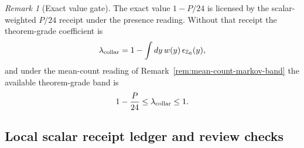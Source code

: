 \documentclass[11pt]{article}
\theoremstyle{remark}
\newtheorem{remark}[theorem]{Remark}
\theoremstyle{plain}
\begin{document}
\begin{remark}[Exact value gate]
\label{rem:exact-value-gate}
The exact value \(1-P/24\) is licensed by the scalar-weighted \(P/24\) receipt
under the presence reading. Without that receipt the theorem-grade coefficient
is
\[
\lambda_{\rm collar}
=
1-\int dy\,w(y)\,\epsilon_{\mathbb Z_6}(y),
\]
and under the mean-count reading of Remark~\ref{rem:mean-count-markov-band}
the available theorem-grade band is
\[
1-\frac{P}{24}\le\lambda_{\rm collar}\le1.
\]
\end{remark}

\subsection{Local scalar receipt ledger and review checks}
\label{sec:local-scalar-receipt-ledger}
\end{document}
